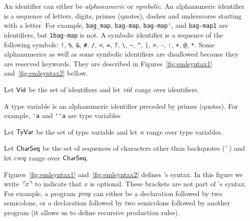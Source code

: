 \documentclass[final]{article}
\begin{document}

An identifier can either be \emph{alphanumeric} or \emph{symbolic}.
An alphanumeric identifier is a sequence of letters, digits, primes
(quotes), dashes and underscores starting with a letter.  For example,
\lstinline{bag_map}, \lstinline{bag-map}, \lstinline{bag-map'}, and
\lstinline{bag-map1} are identifiers, but \lstinline{1bag-map} is not.
A symbolic identifier is a sequence of the following symbols:
\lstinline{!}, \lstinline{%},
\lstinline{&}, \lstinline{#}, \lstinline{/}, \lstinline{<},
\lstinline{=}, \lstinline{?}, \lstinline{\}, \lstinline{~},
\lstinline{^}, \lstinline{|}, \lstinline{>}, \lstinline{-},
\lstinline{:}, \lstinline{+}, \lstinline{@}, \lstinline{*}.
Some alphanumerics as well as some symbolic identifiers are disallowed
because they are reserved keywords.  They are described in
Figures~\ref{fig:emlsyntax1} and~\ref{fig:emlsyntax2} bellow.

Let $\mathsf{Vid}$ be the set of identifiers and let $\mathit{vid}$ range over
identifiers.



A type variable is an alphanumeric identifier preceded by primes
(quotes).  For example, \lstinline{'a} and \lstinline{''a} are type
variables

Let $\mathsf{TyVar}$ be the set of type variable and let $\mathit{a}$ range
over type variables.



Let $\mathsf{CharSeq}$ be the set of sequences of characters other than
backquotes ($\char18$) and let $\mathit{cseq}$ range over
$\mathsf{CharSeq}$.


Figures~\ref{fig:emlsyntax1} and~\ref{fig:emlsyntax2} defines \eml's syntax.
%
In this figure we write $\,\ulcorner\!x\urcorner$ to indicate that $x$ is optional.
These brackets are not part of \eml's syntax.  For example, a program
$\mathit{prog}$ can either be a declaration followed by two semicolons, or
a declaration followed by two semicolons followed by another program
(it allows us to define recursive production rules).
\end{document}
